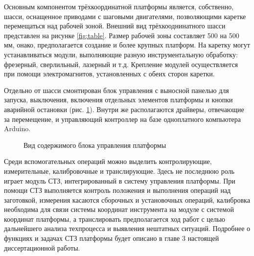 Основным компонентом трёхкоординатной платформы является, собственно, шасси, оснащенное приводами с шаговыми двигателями, позволяющими каретке перемещаться над рабочей зоной. Внешний вид трёхкооднинатного шасси представлен на рисунке \cref{fig:table}. Размер рабочей зоны составляет 500 на 500 мм, онако, предполагается создание и более крупных платформ. На каретку могут устанавливаться модули, выполняющие разную инструментальную обработку: фрезерный, сверлильный, лазерный и т.д. Крепление модулей осуществляется при помощи электромагнитов, установленных с обеих сторон каретки.

Отдельно от шасси смонтирован блок управления с выносной панелью для запуска, выключения, включения отдельных элементов платформы и кнопки аварийной остановки (рис. \cref{fig:blok_upr}). Внутри же располагаются драйверы, отвечающие за перемещение, и управляющий контроллер на базе одноплатного компьютера Arduino.

\begin{figure}[ht]
	\caption{Вид содержимого блока управления платформы}\label{fig:blok_upr}
\end{figure}

Среди вспомогательных операций можно выделить контролирующие, измерительные, калибровочные и транслирующие. Здесь не последнюю роль играет модуль СТЗ, интегрированный в систему управления платформы. При помощи СТЗ выполняется контроль положения и выполнения операций над заготовкой, измерения касаются сборочных и установочных операций, калибровка необходима для связи системы координат инструмента на модуле с системой координат платформы, а транслировать предполагается ход работ с целью дальнейшего анализа техпроцесса и выявления нештатных ситуаций. Подробнее о функциях и задачах СТЗ платформы будет описано в главе 3 настоящей диссертационной работы.

